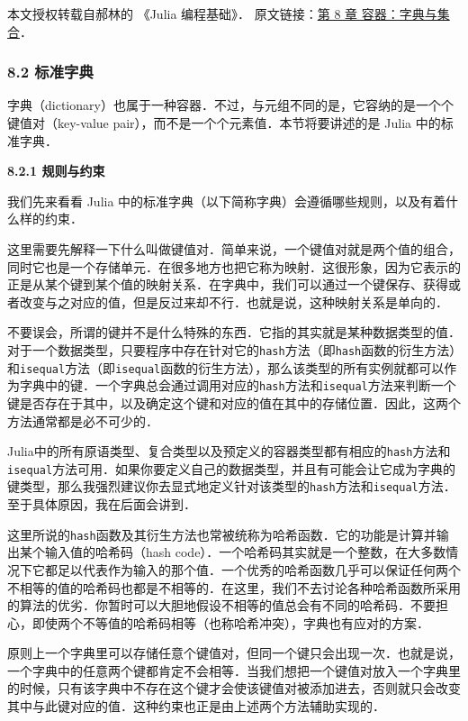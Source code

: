 
本文授权转载自郝林的 《Julia 编程基础》． 原文链接：\href{https://github.com/hyper0x/JuliaBasics/blob/master/book/ch08.md}{第 8 章 容器：字典与集合}．


\subsubsection{8.2 标准字典}

字典（dictionary）也属于一种容器．不过，与元组不同的是，它容纳的是一个个键值对（key-value pair），而不是一个个元素值．本节将要讲述的是 Julia 中的标准字典．

\textbf{8.2.1 规则与约束}

我们先来看看 Julia 中的标准字典（以下简称字典）会遵循哪些规则，以及有着什么样的约束．

这里需要先解释一下什么叫做键值对．简单来说，一个键值对就是两个值的组合，同时它也是一个存储单元．在很多地方也把它称为映射．这很形象，因为它表示的正是从某个键到某个值的映射关系．在字典中，我们可以通过一个键保存、获得或者改变与之对应的值，但是反过来却不行．也就是说，这种映射关系是单向的．

不要误会，所谓的键并不是什么特殊的东西．它指的其实就是某种数据类型的值．对于一个数据类型，只要程序中存在针对它的\verb|hash|方法（即\verb|hash|函数的衍生方法）和\verb|isequal|方法（即\verb|isequal|函数的衍生方法），那么该类型的所有实例就都可以作为字典中的键．一个字典总会通过调用对应的\verb|hash|方法和\verb|isequal|方法来判断一个键是否存在于其中，以及确定这个键和对应的值在其中的存储位置．因此，这两个方法通常都是必不可少的．

Julia中的所有原语类型、复合类型以及预定义的容器类型都有相应的\verb|hash|方法和\verb|isequal|方法可用．如果你要定义自己的数据类型，并且有可能会让它成为字典的键类型，那么我强烈建议你去显式地定义针对该类型的\verb|hash|方法和\verb|isequal|方法．至于具体原因，我在后面会讲到．

这里所说的\verb|hash|函数及其衍生方法也常被统称为哈希函数．它的功能是计算并输出某个输入值的哈希码（hash code）．一个哈希码其实就是一个整数，在大多数情况下它都足以代表作为输入的那个值．一个优秀的哈希函数几乎可以保证任何两个不相等的值的哈希码也都是不相等的．在这里，我们不去讨论各种哈希函数所采用的算法的优劣．你暂时可以大胆地假设不相等的值总会有不同的哈希码．不要担心，即使两个不等值的哈希码相等（也称哈希冲突），字典也有应对的方案．

原则上一个字典里可以存储任意个键值对，但同一个键只会出现一次．也就是说，一个字典中的任意两个键都肯定不会相等．当我们想把一个键值对放入一个字典里的时候，只有该字典中不存在这个键才会使该键值对被添加进去，否则就只会改变其中与此键对应的值．这种约束也正是由上述两个方法辅助实现的．

